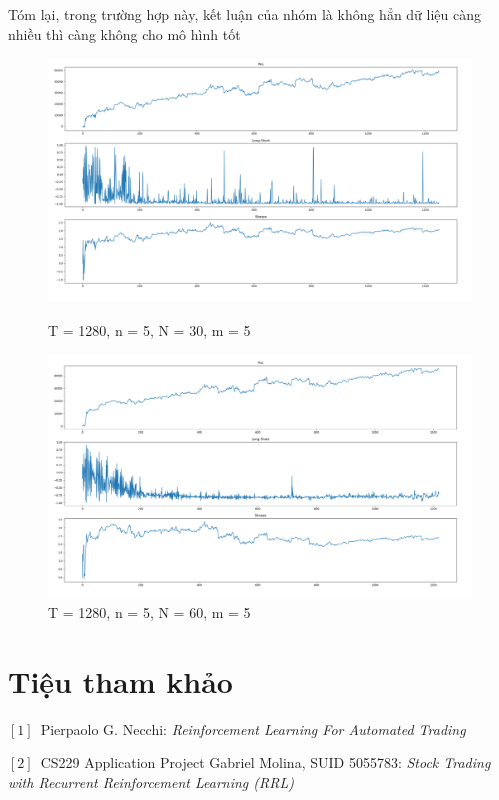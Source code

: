 \documentclass[14pt]{extreport}
\begin{document}
Tóm lại, trong trường hợp này, kết luận của nhóm là không hẳn dữ liệu càng nhiều thì càng không cho mô hình tốt
\begin{center}
    \begin{figure}[htp]
    \begin{center}
     \includegraphics[scale=.4]{result_1-1}
    \end{center}
    \caption{T = 1280, n = 5, N = 30, m = 5}
    \begin{center}
     \includegraphics[scale=.4]{result_2-1}
    \end{center}
    \caption{T = 1280, n = 5, N = 60, m = 5}
    \end{figure}
\end{center} 

\chapter*{Tiệu tham khảo}
\begin{flushleft}

\quad $[1]$\ Pierpaolo G. Necchi: \textit{ Reinforcement Learning For Automated Trading}

\quad $[2]$\ CS229 Application Project
Gabriel Molina, SUID 5055783: \textit{ Stock Trading with Recurrent Reinforcement
Learning (RRL)}
\end{flushleft}
\end{document}
